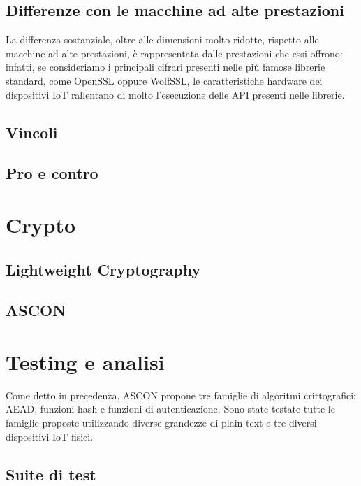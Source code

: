 \documentclass{report}
\begin{document}
\section{Differenze con le macchine ad alte prestazioni}

La differenza sostanziale, oltre alle dimensioni molto ridotte, rispetto alle macchine ad alte prestazioni, è rappresentata dalle prestazioni che essi offrono: infatti, se consideriamo i principali cifrari presenti nelle più famose librerie standard, come OpenSSL oppure WolfSSL, le caratteristiche hardware dei dispositivi IoT rallentano di molto l'esecuzione delle API presenti nelle librerie. 

\section{Vincoli}

\section{Pro e contro}

\newpage

\chapter{Crypto}

\section{Lightweight Cryptography}

\section{ASCON}

\newpage

\chapter{Testing e analisi}

Come detto in precedenza, ASCON propone tre famiglie di algoritmi crittografici: AEAD, funzioni hash e funzioni di autenticazione. Sono state testate tutte le famiglie proposte utilizzando diverse grandezze di plain-text e tre diversi dispositivi IoT fisici.

\section{Suite di test}
\end{document}

